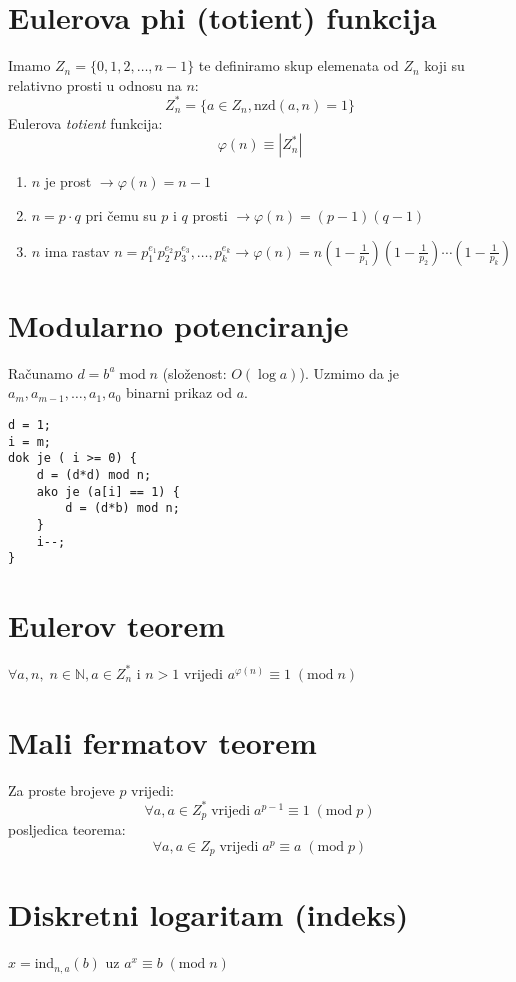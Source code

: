 \documentclass[11pt]{article}
\begin{document}
\section{Eulerova phi (totient) funkcija}
Imamo $Z_n = \{0, 1, 2, \ldots, n-1\}$ te definiramo skup elemenata od $Z_n$ koji su relativno prosti u odnosu na $n$:
$$Z_n^* = \{a \in Z_n, \text{nzd}(a,n)=1\}$$
Eulerova \emph{totient} funkcija:
$$\varphi(n) \equiv |Z_n^*|$$
\begin{enumerate}
\item $n$ je prost $\rightarrow \varphi(n) = n-1$
\item $n = p \cdot q$ pri čemu su $p$ i $q$ prosti $\rightarrow \varphi(n) = (p-1)(q-1)$
\item $n$ ima rastav $n = p_1^{e_1}p_2^{e_2}p_3^{e_3},\ldots,p_k^{e_k} \rightarrow \varphi(n) = n \left(1-\frac{1}{p_1}\right)\left( 1-\frac{1}{p_2}\right)\cdots\left( 1-\frac{1}{p_k}\right)$
\end{enumerate}
\section{Modularno potenciranje}
Računamo $d = b^a \;\text{mod}\; n$ (složenost: $O(\log a)$). Uzmimo da je $a_m, a_{m-1}, \ldots, a_1, a_0$ binarni prikaz od $a$.
\begin{verbatim}
d = 1;
i = m;
dok je ( i >= 0) {
    d = (d*d) mod n;
    ako je (a[i] == 1) {
        d = (d*b) mod n;
    }
    i--;
}
\end{verbatim}

\section{Eulerov teorem}
$\forall a,n,\; n \in \mathbb{N}, a \in Z_n^*$ i $n>1$ vrijedi $a^{\varphi(n)} \equiv 1\; (\text{mod}\; n)$
\section{Mali fermatov teorem}
Za proste brojeve $p$ vrijedi:
$$\forall a, a \in Z_p^* \; \text{vrijedi}\; a^{p-1} \equiv 1\; (\text{mod}\; p)$$
posljedica teorema:
$$\forall a, a \in Z_p \; \text{vrijedi}\; a^{p} \equiv a\; (\text{mod}\; p)$$
\section{Diskretni logaritam (indeks)}
$x = \text{ind}_{n,a}(b)$  uz $a^x \equiv b\; (\text{mod}\; n)$
\end{document}

